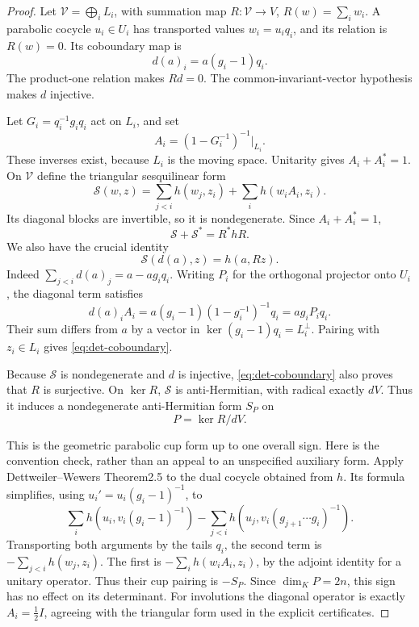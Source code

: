 \begin{proof}
Let \(\mathcal V=\bigoplus_iL_i\), with summation map
\(R:\mathcal V\to V\), \(R(w)=\sum_iw_i\).  A parabolic cocycle
\(u_i\in U_i\) has transported values \(w_i=u_iq_i\), and its relation
is \(R(w)=0\).  Its coboundary map is
\[
                    d(a)_i=a(g_i-1)q_i.
\]
The product-one relation makes \(Rd=0\).  The common-invariant-vector
hypothesis makes \(d\) injective.

Let \(G_i=q_i^{-1}g_iq_i\) act on \(L_i\), and set
\[
             A_i=(1-G_i^{-1})^{-1}|_{L_i}.
\]
These inverses exist, because \(L_i\) is the moving space.  Unitarity
gives \(A_i+A_i^*=1\).  On \(\mathcal V\) define the triangular
sesquilinear form
\[
 \mathcal S(w,z)=\sum_{j<i}h(w_j,z_i)+\sum_i h(w_iA_i,z_i).
\]
Its diagonal blocks are invertible, so it is nondegenerate.  Since
\(A_i+A_i^*=1\),
\[
                  \mathcal S+\mathcal S^*=R^*hR.
\]
We also have the crucial identity
\begin{equation}\label{eq:det-coboundary}
                     \mathcal S(d(a),z)=h(a,Rz).
\end{equation}
Indeed
\(\sum_{j<i}d(a)_j=a-a g_iq_i\).  Writing \(P_i\) for the
orthogonal projector onto \(U_i\), the diagonal term satisfies
\[
 d(a)_iA_i=a(g_i-1)(1-g_i^{-1})^{-1}q_i
                         =a g_iP_iq_i.
\]
Their sum differs from \(a\) by a vector in
\(\ker(g_i-1)q_i=L_i^\perp\).  Pairing with \(z_i\in L_i\) gives
\eqref{eq:det-coboundary}.

Because \(\mathcal S\) is nondegenerate and \(d\) is injective,
\eqref{eq:det-coboundary} also proves that \(R\) is surjective.
On \(\ker R\), \(\mathcal S\) is anti-Hermitian, with radical
exactly \(dV\).  Thus it induces a nondegenerate anti-Hermitian form
\(S_P\) on
\[
                         P=\ker R/dV.
\]

This is the geometric parabolic cup form up to one overall sign.
Here is the convention check, rather than an appeal to an unspecified
auxiliary form.  Apply Dettweiler--Wewers Theorem2.5 to the dual cocycle
obtained from \(h\).  Its formula simplifies, using
\(u_i'=u_i(g_i-1)^{-1}\), to
\[
 \sum_i h(u_i,v_i(g_i-1)^{-1})
       -\sum_{j<i}h(u_j,v_i(g_{j+1}\cdots g_i)^{-1}).
\]
Transporting both arguments by the tails \(q_i\), the second term is
\(-\sum_{j<i}h(w_j,z_i)\).  The first is
\(-\sum_i h(w_iA_i,z_i)\), by the adjoint identity for a unitary
operator.  Thus their cup pairing is \(-S_P\).  Since \(\dim_KP=2n\),
this sign has no effect on its determinant.  For involutions the diagonal
operator is exactly \(A_i=\tfrac12 I\), agreeing with the triangular
form used in the explicit certificates.


\end{proof}
